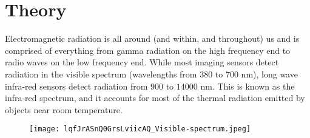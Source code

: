 \section{Theory}
\label{sec:theory}
Electromagnetic radiation is all around (and within, and throughout) us and is
comprised of everything from gamma radiation on the high frequency end to radio
waves on the low frequency end. While most imaging sensors detect radiation in
the visible spectrum (wavelengths from 380 to 700 \si{\nano\meter}), long wave
infra-red sensors detect radiation from $900$ to $14000$ \si{\nano\meter}. This
is known as the infra-red spectrum, and it accounts for most of the thermal
radiation emitted by objects near room temperature.
%
\begin{figure}[htb]
	\centering
	\texttt{[image: lqfJrASnQ0GrsLviicAQ\_Visible-spectrum.jpeg]}
	\label{fig:spectrum}
\end{figure}